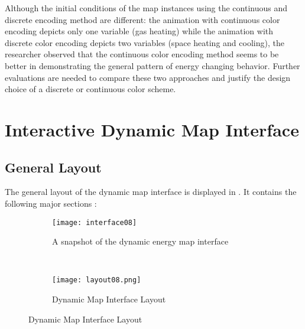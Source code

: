 Although the initial conditions of the map instances using the
continuous and discrete encoding method are different: the animation
with continuous color encoding depicts only one variable (gas heating)
while the animation with discrete color encoding depicts two variables
(space heating and cooling), the researcher observed that the
continuous color encoding method seems to be better in demonstrating
the general pattern of energy changing behavior. Further evaluations
are needed to compare these two approaches and justify the design
choice of a discrete or continuous color scheme.
\section{Interactive Dynamic Map Interface}
\subsection{General Layout}
The general layout of the dynamic map interface is displayed in
. It contains the following major sections :
\begin{figure}[h!]
  \centering
  \begin{subfigure}{0.7\textwidth}
  \centering
  \texttt{[image: interface08]}
  \caption[Dynamic Energy Map Interface Snapshot]{A snapshot of the dynamic energy map interface}
  \label{fig:interface08}
\end{subfigure}
~
\begin{subfigure}{0.7\textwidth}
  \centering
  \texttt{[image: layout08.png]}
  \caption[Dynamic Energy Map Interface Layout]{Dynamic Map Interface Layout}
  \label{fig:layout08}
\end{subfigure}
\caption{Dynamic Map Interface Layout}
\label{fig:interfaceLayout}
\end{figure}

